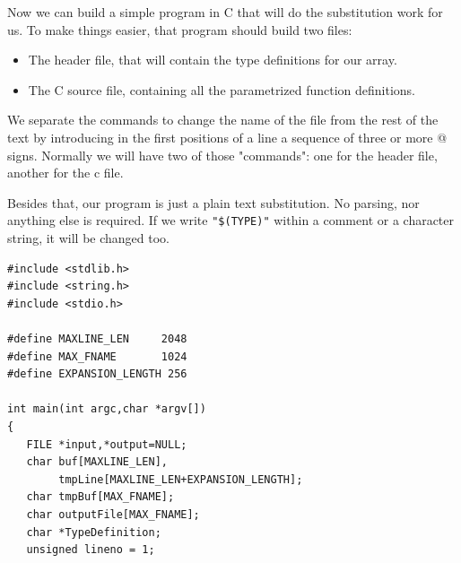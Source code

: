 \documentclass[12pt,a4paper]{memoir} %
\begin{document}
{{Now we can build a simple program in C that will do the substitution work for us. To make things easier, that program should build two files:
\begin{itemize}
\item The header file, that will contain the type definitions for our array.
\item The C source file, containing all the parametrized function definitions.
\end{itemize}
We separate the commands to change the name of the file from the rest of the text by introducing in the first positions of a line a sequence of three or more @ signs.  Normally we will have two of those "commands": one for the header file, another for the c file.

Besides that, our program is just a plain text substitution. No parsing, nor anything else is required. If we write \texttt{"\$(TYPE)"} within a comment or a character string, it will be changed too.
\begin{verbatim}
#include <stdlib.h>
#include <string.h>
#include <stdio.h>

#define MAXLINE_LEN     2048
#define MAX_FNAME       1024
#define EXPANSION_LENGTH 256

int main(int argc,char *argv[])
{
   FILE *input,*output=NULL;
   char buf[MAXLINE_LEN],
        tmpLine[MAXLINE_LEN+EXPANSION_LENGTH];
   char tmpBuf[MAX_FNAME];
   char outputFile[MAX_FNAME];
   char *TypeDefinition;
   unsigned lineno = 1;


\end{verbatim}}}
\end{document}
